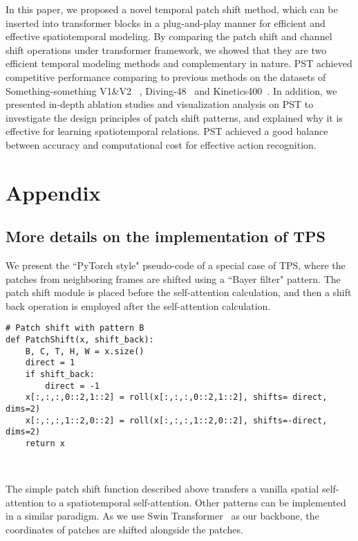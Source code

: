 \documentclass[runningheads]{llncs}
\begin{document}
	In this paper, we proposed a novel temporal patch shift method, which can be inserted into transformer blocks in a plug-and-play manner for efficient and effective spatiotemporal modeling. By comparing the patch shift and channel shift operations under transformer framework, we showed that they are two efficient temporal modeling methods and complementary in nature. PST achieved competitive performance comparing to previous methods on the datasets of Something-something V1\&V2 ~\cite{goyal2017something}, Diving-48~\cite{li2018resound} and Kinetics400~\cite{kay2017kinetics}. In addition, we presented in-depth ablation studies and visualization analysis on PST to investigate the design principles of patch shift patterns, and explained why it is effective for learning spatiotemporal relations. PST achieved a good balance between accuracy and computational cost for effective action recognition.
	
	\appendix
	
	\section{Appendix}
	
	\subsection{More details on the implementation of TPS}
	
	We present the ``PyTorch style" pseudo-code of a special case of TPS, where the patches from neighboring frames are shifted using a ``Bayer filter" pattern. The patch shift module is placed before the self-attention calculation, and then a shift back operation is employed after the self-attention calculation.
	\begin{lstlisting}
# Patch shift with pattern B
def PatchShift(x, shift_back):
	B, C, T, H, W = x.size()
	direct = 1
	if shift_back:
		direct = -1
	x[:,:,:,0::2,1::2] = roll(x[:,:,:,0::2,1::2], shifts= direct, dims=2)
	x[:,:,:,1::2,0::2] = roll(x[:,:,:,1::2,0::2], shifts=-direct, dims=2)
	return x
		
		
	\end{lstlisting}
	
	The simple patch shift function described above transfers a vanilla spatial self-attention to a spatiotemporal self-attention. Other patterns can be implemented in a similar paradigm. As we use Swin Transformer~\cite{liu2021swin} as our backbone, the coordinates of patches are shifted alongside the patches. 
\end{document}
